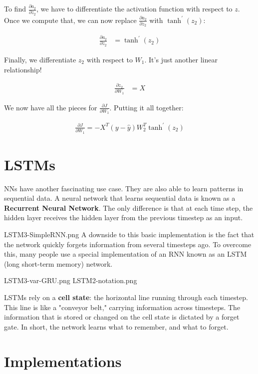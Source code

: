 \documentclass[]{article}
\begin{document}
To find $\frac{\partial a_2}{\partial z_2}$, we have to differentiate the activation function with respect to $z$. Once we compute that, we can now replace $\frac{\partial a_2}{\partial z_2}$ with $\tanh^\prime(z_2)$:

\begin{align}
	\frac{\partial a_2}{\partial z_2} &= \tanh^\prime(z_2)
\end{align}

Finally, we differentiate $z_2$ with respect to $W_1$. It's just another linear relationship!

\begin{align}
	\frac{\partial z_2}{\partial W_1} &= X
\end{align}

We now have all the pieces for $\frac{\partial J}{\partial W_1}$. Putting it all together:

\begin{align}
\frac{\partial J}{\partial W_1} =
- X^{T}
(y - \hat{y})
W_2^{T}
\tanh^\prime(z_2)
\end{align}

\section{LSTMs}

NNs have another fascinating use case. They are also able to learn patterns in sequential data. A neural network that learns sequential data is known as a \textbf{Recurrent Neural Network}. The only difference is that at each time step, the hidden layer receives the hidden layer from the previous timestep as an input.

  LSTM3-SimpleRNN.png
A downside to this basic implementation is the fact that the network quickly forgets information from several timesteps ago. To overcome this, many people use a special implementation of an RNN known as an LSTM (long short-term memory) network.

  LSTM3-var-GRU.png
  LSTM2-notation.png

LSTMs rely on a \textbf{cell state}: the horizontal line running through each timestep. This line is like a "conveyor belt," carrying information across timesteps. The information that is stored or changed on the cell state is dictated by a forget gate. In short, the network learns what to remember, and what to forget.

\section{Implementations}
\end{document}
